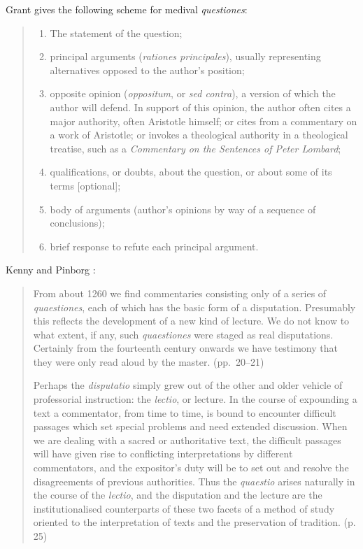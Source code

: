 \documentclass{article}
\theoremstyle{definition}
\begin{document}
Grant \cite[pp.~106--107]{grant2001} gives the following scheme for medival {\em questiones}:
\begin{quote}
\begin{enumerate}
\item The statement of the question;
\item principal arguments ({\em rationes principales}), usually representing alternatives opposed to the author's
position;
\item opposite opinion ({\em oppositum}, or {\em sed contra}), a version of which the author will defend. In support
of this opinion, the author often cites a major authority, often Aristotle himself; or cites from a commentary on a work
of Aristotle; or invokes a theological authority in a theological treatise, such as a {\em Commentary on the Sentences of Peter Lombard};
\item qualifications, or doubts, about the question, or about some of its terms [optional];
\item body of arguments (author's opinions by way of a sequence of conclusions);
\item brief response to refute each principal argument.
\end{enumerate}
\end{quote}


 Kenny and Pinborg \cite{kenny}:
 \begin{quote}
 From about 1260 we find commentaries consisting only of a series of {\em quaestiones}, each of which
 has the basic form of a disputation. Presumably this reflects the development of a new kind of lecture.
 We do not know to what extent, if any, such {\em quaestiones} were staged as real disputations. Certainly
 from the fourteenth century onwards we have testimony that they were only read
 aloud by the master. (pp.~20--21)
 
 Perhaps the {\em disputatio} simply grew out of the other and older vehicle of professorial instruction:
 the {\em lectio}, or lecture. In the course of expounding a text a commentator, from time to time, is bound
 to encounter difficult passages which set special problems and need extended discussion. When we are dealing
 with a sacred or authoritative text, the difficult passages will have given rise to conflicting interpretations
 by different commentators, and the expositor's duty will be to set out and resolve the disagreements of previous
 authorities. Thus the {\em quaestio} arises naturally in the course of the {\em lectio}, and the disputation and
 the lecture are the institutionalised counterparts of these two facets of a method of study oriented
 to the interpretation of texts and the preservation of tradition. (p. 25)
 \end{quote}
 
\end{document}
